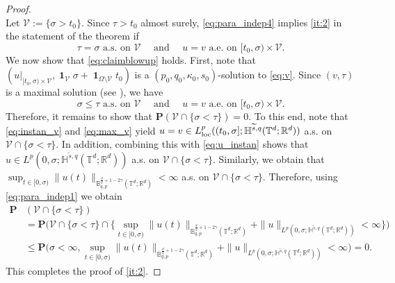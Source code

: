 \documentclass[11pt, a4paper,oneside, reqno]{amsart}
\theoremstyle{remark} %
\theoremstyle{definition} %
\numberwithin{theorem}{section}
\numberwithin{equation}{section}
\newcommand{\T}{\mathbb{T}}
\newcommand{\Hs}{\mathbb{H}}
\newcommand{\RR}{\mathbb{R}}
\newcommand{\BB}{\mathbb{B}}
\newcommand{\RRd}{\RR^d}
\newcommand{\gam}{\gamma}
\newcommand{\loc}{{\rm loc}}
\renewcommand{\tilde}[1]{\widetilde{#1}}
\DeclareMathOperator{\ind}{\mathbf{1}}
\begin{document}
\begin{proof}
\begin{equation}
\end{equation}
Let $\mathcal{V}:=\{\sigma>t_0\}$. Since $\tau>t_0$ almost surely, \eqref{eq:para_indep4} implies \ref{it:2} in the statement of the theorem if
\begin{equation}\label{eq:claimblowup}
    \tau =\sigma \text{ a.s. on }\mathcal{V}\quad \text{ and }\quad u=v \text{ a.e. on }[t_0,\sigma)\times \mathcal{V}.
\end{equation}
We now show that \eqref{eq:claimblowup} holds. First, note that $(u|_{[t_0, \sigma)\times \mathcal{V}}, \ind_{\mathcal{V}}\sigma+\ind_{\Omega\setminus\mathcal{V}}t_0)$ is a $(p_0, q_0,\kappa_0,s_0)$-solution to \eqref{eq:v}. Since $(v,\tau)$ is a maximal solution (see \cite[Definition 4.6(3)]{AV25_survey}), we have
\begin{equation}\label{eq:max_v}
    \sigma\leq \tau \text{ a.s. on }\mathcal{V}\quad \text{ and }\quad  u=v \text{ a.e. on }[t_0,\sigma)\times \mathcal{V}.
\end{equation}
Therefore, it remains to show that $\mathbf{P}(\mathcal{V}\cap \{\sigma< \tau\})=0$. To this end, note that \eqref{eq:instan_v} and \eqref{eq:max_v} yield $u=v \in L^p_\loc((t_0, \sigma]; \Hs^{\tilde{s},q}(\T^d; \RR^d))$ a.s. on $\mathcal{V}\cap \{\sigma<\tau\}$. In addition, combining this with \eqref{eq:u_instan} shows that $u\in L^p(0, \sigma; \Hs^{\tilde{s},q}(\T^d;\RRd))$ a.s. on $\mathcal{V}\cap \{\sigma<\tau\}$. Similarly, we obtain that $\sup_{t\in [0, \sigma)}\|u(t)\|_{\BB^{\frac{d}{q}+1-2\gam}_{q,p}(\T^d;\RRd)}<\infty$ a.s. on $\mathcal{V}\cap \{\sigma<\tau\}$. Therefore, using \eqref{eq:para_indep1} we obtain
\begin{align*}
    \mathbf{P}&(\mathcal{V}\cap \{\sigma<\tau\})\\&= \mathbf{P}\Big(\mathcal{V}\cap \{\sigma<\tau\}\cap \big\{\sup_{t\in [0, \sigma)}\|u(t)\|_{\BB^{\frac{d}{q}+1-2\gam}_{q,p}(\T^d;\RRd)}+ \|u\|_{L^p(0, \sigma; \Hs^{\tilde{s},q}(\T^d;\RRd))}<\infty\big\}\Big)\\
    &\leq \mathbf{P}\Big(\sigma<\infty, \sup_{t\in [0, \sigma)}\|u(t)\|_{\BB^{\frac{d}{q}+1-2\gam}_{q,p}(\T^d;\RRd)}+ \|u\|_{L^p(0, \sigma; \Hs^{\tilde{s},q}(\T^d;\RRd))}<\infty\Big)=0.
\end{align*}
This completes the proof of \ref{it:2}.


\end{proof}
\end{document}
